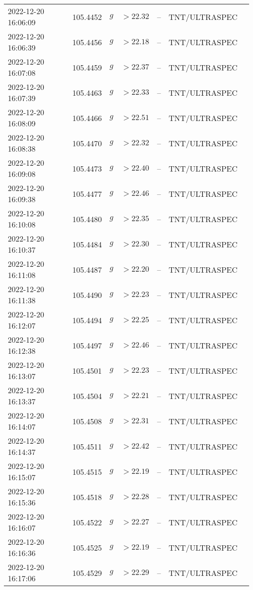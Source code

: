 \documentclass{nature_plusfigure}
\begin{document}
\begin{supplement}
\begin{center}
\begin{longtable}{lllllll}
2022-12-20 16:06:09 & 105.4452 & $g$ & $>22.32$ & -- & TNT/ULTRASPEC &  \\ 
2022-12-20 16:06:39 & 105.4456 & $g$ & $>22.18$ & -- & TNT/ULTRASPEC &  \\ 
2022-12-20 16:07:08 & 105.4459 & $g$ & $>22.37$ & -- & TNT/ULTRASPEC &  \\ 
2022-12-20 16:07:39 & 105.4463 & $g$ & $>22.33$ & -- & TNT/ULTRASPEC &  \\ 
2022-12-20 16:08:09 & 105.4466 & $g$ & $>22.51$ & -- & TNT/ULTRASPEC &  \\ 
2022-12-20 16:08:38 & 105.4470 & $g$ & $>22.32$ & -- & TNT/ULTRASPEC &  \\ 
2022-12-20 16:09:08 & 105.4473 & $g$ & $>22.40$ & -- & TNT/ULTRASPEC &  \\ 
2022-12-20 16:09:38 & 105.4477 & $g$ & $>22.46$ & -- & TNT/ULTRASPEC &  \\ 
2022-12-20 16:10:08 & 105.4480 & $g$ & $>22.35$ & -- & TNT/ULTRASPEC &  \\ 
2022-12-20 16:10:37 & 105.4484 & $g$ & $>22.30$ & -- & TNT/ULTRASPEC &  \\ 
2022-12-20 16:11:08 & 105.4487 & $g$ & $>22.20$ & -- & TNT/ULTRASPEC &  \\ 
2022-12-20 16:11:38 & 105.4490 & $g$ & $>22.23$ & -- & TNT/ULTRASPEC &  \\ 
2022-12-20 16:12:07 & 105.4494 & $g$ & $>22.25$ & -- & TNT/ULTRASPEC &  \\ 
2022-12-20 16:12:38 & 105.4497 & $g$ & $>22.46$ & -- & TNT/ULTRASPEC &  \\ 
2022-12-20 16:13:07 & 105.4501 & $g$ & $>22.23$ & -- & TNT/ULTRASPEC &  \\ 
2022-12-20 16:13:37 & 105.4504 & $g$ & $>22.21$ & -- & TNT/ULTRASPEC &  \\ 
2022-12-20 16:14:07 & 105.4508 & $g$ & $>22.31$ & -- & TNT/ULTRASPEC &  \\ 
2022-12-20 16:14:37 & 105.4511 & $g$ & $>22.42$ & -- & TNT/ULTRASPEC &  \\ 
2022-12-20 16:15:07 & 105.4515 & $g$ & $>22.19$ & -- & TNT/ULTRASPEC &  \\ 
2022-12-20 16:15:36 & 105.4518 & $g$ & $>22.28$ & -- & TNT/ULTRASPEC &  \\ 
2022-12-20 16:16:07 & 105.4522 & $g$ & $>22.27$ & -- & TNT/ULTRASPEC &  \\ 
2022-12-20 16:16:36 & 105.4525 & $g$ & $>22.19$ & -- & TNT/ULTRASPEC &  \\ 
2022-12-20 16:17:06 & 105.4529 & $g$ & $>22.29$ & -- & TNT/ULTRASPEC &  \\ 

\end{longtable}
\end{center}
\end{supplement}
\end{document}
